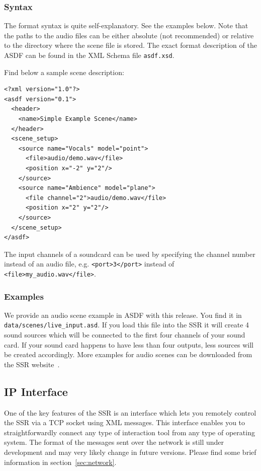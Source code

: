 \subsubsection{Syntax}

The format syntax is quite self-explanatory. See the examples below.
Note that the paths to the audio files can be either absolute (not
recommended) or relative to the directory where the scene file is
stored. The exact format description of the ASDF can be found in the
XML Schema file \texttt{asdf.xsd}.

\noindent Find below a sample scene description:

\begin{verbatim}
<?xml version="1.0"?>
<asdf version="0.1">
  <header>
    <name>Simple Example Scene</name>
  </header>
  <scene_setup>
    <source name="Vocals" model="point">
      <file>audio/demo.wav</file>
      <position x="-2" y="2"/>
    </source>
    <source name="Ambience" model="plane">
      <file channel="2">audio/demo.wav</file>
      <position x="2" y="2"/>
    </source>
  </scene_setup>
</asdf>
\end{verbatim}

\noindent The input channels of a soundcard can be used by specifying the
channel number instead of an audio file, e.g. \verb|<port>3</port>| instead of
\verb|<file>my_audio.wav</file>|.

\subsubsection{Examples}

We provide an audio scene example in ASDF with this release. You find it in
\texttt{data/scenes/live\_input.asd}. If you load this file into the SSR it
will create 4 sound sources which will be connected to the first four channels
of your sound card. If your sound card happens to have less than four outputs, less sources will be created accordingly.
More examples for audio scenes can be downloaded from the SSR
website~\cite{ssr}.

\subsection{IP Interface}

\label{sec:ip_interface}

One of the key features of the SSR is an interface which lets you
remotely control the SSR via a TCP socket using XML messages. This
interface enables you to straightforwardly connect any type of
interaction tool from any type of operating system.
The format of the messages sent over the network is still under development and
may very likely change in future versions.
Please find some
brief information in section~\ref{sec:network}.

